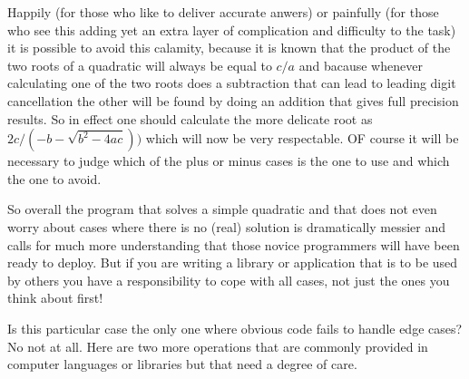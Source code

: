 Happily (for those who like to deliver accurate anwers) or painfully (for
those who see this adding yet an extra layer of complication and
difficulty to the task) it is possible to avoid this calamity, because
it is known that the product of the two roots of a quadratic will
always be equal to $c/a$ and bacause whenever calculating one of the two roots
does a subtraction that can lead to leading digit cancellation the other
will be found by doing an addition that gives full precision results. So
in effect one should calculate the more delicate root as
$2 c/(-b - \sqrt{b^2 - 4 a c}))$ which will now be very respectable.
OF course it will be necessary to judge which of the plus or minus cases
is the one to use and which the one to avoid.

So overall the program that solves a simple quadratic and that does not
even worry about cases where there is no (real) solution is dramatically
messier and calls for much more understanding that those novice
programmers will have been ready to deploy. But if you are writing a library
or application that is to be used by others you have a responsibility to
cope with all cases, not just the ones you think about first!

Is this particular case the only one where obvious code fails to handle
edge cases? No not at all. Here are two more operations that are commonly
provided in computer languages or libraries but that need a degree of care.

